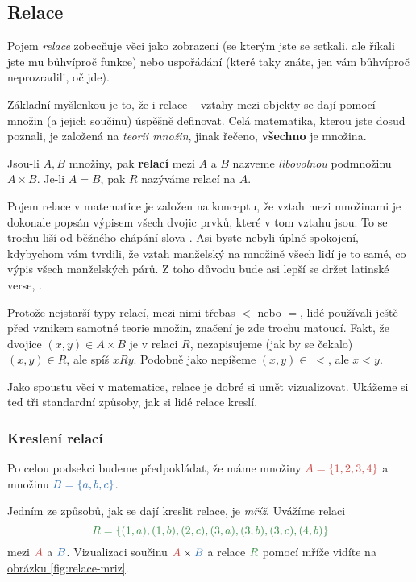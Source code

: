 \subsection{Relace}
\label{ssec:relace}

Pojem \emph{relace} zobecňuje věci jako zobrazení (se kterým jste se setkali,
ale říkali jste mu bůhvíproč funkce) nebo uspořádání (které taky znáte, jen vám
bůhvíproč neprozradili, oč jde).

Základní myšlenkou je to, že i relace -- vztahy mezi objekty se dají pomocí
množin (a jejich součinu) úspěšně definovat. Celá matematika, kterou jste dosud
poznali, je založená na \emph{teorii množin}, jinak řečeno, \textbf{všechno} je
množina.

\begin{definition}[Relace]
 Jsou-li $A,B$ množiny, pak \textbf{relací} mezi $A$ a $B$ nazveme
 \emph{libovolnou} podmnožinu $A \times B$. Je-li $A = B$, pak $R$ nazýváme
 relací na $A$.
\end{definition}

Pojem relace v matematice je založen na konceptu, že vztah mezi množinami je
dokonale popsán výpisem všech dvojic prvků, které v tom vztahu jsou. To se
trochu liší od běžného chápání slova . Asi byste nebyli úplně
spokojení, kdybychom vám tvrdili, že vztah manželský na množině všech lidí je to
samé, co výpis všech manželských párů. Z toho důvodu bude asi lepší se držet
latinské verse, .

Protože nejstarší typy relací, mezi nimi třebas $<$ nebo $=$, lidé používali
ještě před vznikem samotné teorie množin, značení je zde trochu matoucí. Fakt,
že dvojice $(x,y) \in A \times B$ je v relaci $R$, nezapisujeme (jak by se
čekalo) $(x,y) \in R$, ale spíš $xRy$. Podobně jako nepíšeme $(x,y) \in \; <$,
ale $x < y$.

Jako spoustu věcí v matematice, relace je dobré si umět vizualizovat. Ukážeme si
teď tři standardní způsoby, jak si lidé relace kreslí.

\subsubsection{Kreslení relací}
\label{sssec:kresleni-relaci}

Po celou podsekci budeme předpokládat, že máme množiny $\clr{A = \{1, 2, 3,
4\}}$ a množinu $\clb{B = \{a, b, c\}}$.

Jedním ze způsobů, jak se dají kreslit relace, je \emph{mříž}. Uvážíme relaci
\[
 \clg{R = \{(1, a), (1, b), (2, c), (3, a), (3, b), (3, c), (4, b)\}}
\]
mezi $\clr{A}$ a $\clb{B}$. Vizualizaci součinu $\clr{A} \times \clb{B}$ a
relace $\clg{R}$ pomocí mříže vidíte na \hyperref[fig:relace-mriz]{obrázku
\ref*{fig:relace-mriz}}.

